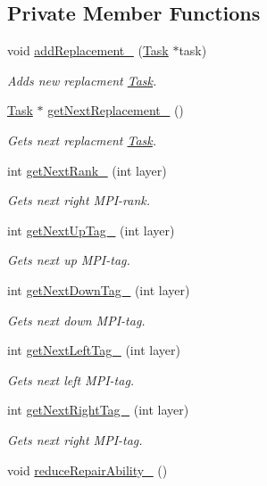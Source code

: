 \subsection*{Private Member Functions}
\begin{DoxyCompactItemize}
\item 
void \hyperlink{classTask_a2be9ef85af890d0d1d03419c3aa3c5a5}{add\+Replacement\+\_\+} (\hyperlink{classTask}{Task} $\ast$task)
\begin{DoxyCompactList}\small\item\em Adds new replacment \hyperlink{classTask}{Task}. \end{DoxyCompactList}\item 
\hyperlink{classTask}{Task} $\ast$ \hyperlink{classTask_ad68b20393fd9626df255ce965c7084b4}{get\+Next\+Replacement\+\_\+} ()
\begin{DoxyCompactList}\small\item\em Gets next replacment \hyperlink{classTask}{Task}. \end{DoxyCompactList}\item 
int \hyperlink{classTask_a9e1772ee1d516932f37e6fce7dcd8784}{get\+Next\+Rank\+\_\+} (int layer)
\begin{DoxyCompactList}\small\item\em Gets next right M\+P\+I-\/rank. \end{DoxyCompactList}\item 
int \hyperlink{classTask_a4d84ca19e841fa134285e2d42d310124}{get\+Next\+Up\+Tag\+\_\+} (int layer)
\begin{DoxyCompactList}\small\item\em Gets next up M\+P\+I-\/tag. \end{DoxyCompactList}\item 
int \hyperlink{classTask_a888458368188ea57e6c69523d98a5cc6}{get\+Next\+Down\+Tag\+\_\+} (int layer)
\begin{DoxyCompactList}\small\item\em Gets next down M\+P\+I-\/tag. \end{DoxyCompactList}\item 
int \hyperlink{classTask_a84ed7441bbaaee365580dabbb3ed8a61}{get\+Next\+Left\+Tag\+\_\+} (int layer)
\begin{DoxyCompactList}\small\item\em Gets next left M\+P\+I-\/tag. \end{DoxyCompactList}\item 
int \hyperlink{classTask_ad96cd097dc05cc5946ccd072a7be47b9}{get\+Next\+Right\+Tag\+\_\+} (int layer)
\begin{DoxyCompactList}\small\item\em Gets next right M\+P\+I-\/tag. \end{DoxyCompactList}\item 
void \hyperlink{classTask_aba992256623e8504401f1b8f897c3fc2}{reduce\+Repair\+Ability\+\_\+} ()\hypertarget{classTask_aba992256623e8504401f1b8f897c3fc2}{}\label{classTask_aba992256623e8504401f1b8f897c3fc2}


\end{DoxyCompactItemize}
